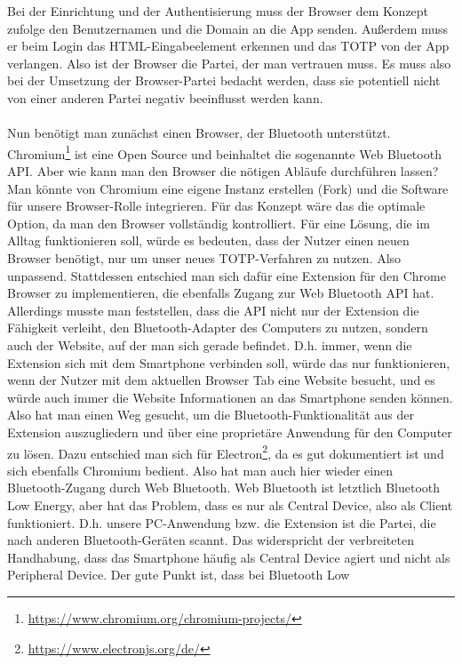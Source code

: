 Bei der Einrichtung und der Authentisierung muss der Browser dem Konzept zufolge 
den Benutzernamen und die Domain an die App senden. Außerdem muss er beim Login das 
HTML-Eingabeelement erkennen und das TOTP von der App verlangen. Also ist der 
Browser die Partei, der man vertrauen muss. Es muss also bei der Umsetzung der 
Browser-Partei bedacht werden, dass sie potentiell nicht von einer anderen Partei 
negativ beeinflusst werden kann.
\\\\
Nun benötigt man zunächst einen Browser, der Bluetooth unterstützt. 
Chromium\footnote{\href{https://www.chromium.org/chromium-projects/}{https://www.chromium.org/chromium-projects/}} 
ist eine Open Source und beinhaltet die sogenannte Web Bluetooth API. Aber wie kann 
man den Browser die nötigen Abläufe durchführen lassen? Man könnte von Chromium 
eine eigene Instanz erstellen (Fork) und die Software für unsere Browser-Rolle 
integrieren. Für das Konzept wäre das die optimale Option, da man den Browser 
vollständig kontrolliert. Für eine Lösung, die im Alltag funktionieren soll, würde 
es bedeuten, dass der Nutzer einen neuen Browser benötigt, nur um unser neues 
TOTP-Verfahren zu nutzen. Also unpassend. Stattdessen entschied man sich dafür eine 
Extension für den Chrome Browser zu implementieren, die ebenfalls Zugang zur Web 
Bluetooth API hat. Allerdings musste man feststellen, dass die API nicht nur der 
Extension die Fähigkeit verleiht, den Bluetooth-Adapter des Computers zu nutzen, 
sondern auch der Website, auf der man sich gerade befindet. D.h. immer, wenn die 
Extension sich mit dem Smartphone verbinden soll, würde das nur funktionieren, wenn 
der Nutzer mit dem aktuellen Browser Tab eine Website besucht, und es würde auch 
immer die Website Informationen an das Smartphone senden können. Also hat man einen 
Weg gesucht, um die Bluetooth-Funktionalität aus der Extension auszugliedern und 
über eine proprietäre Anwendung für den Computer zu lösen. Dazu entschied man sich 
für Electron\footnote{\href{https://www.electronjs.org/de/}{https://www.electronjs.org/de/}}, 
da es gut dokumentiert ist und sich ebenfalls Chromium bedient. Also hat man auch 
hier wieder einen Bluetooth-Zugang durch Web Bluetooth. Web Bluetooth ist letztlich 
Bluetooth Low Energy, aber hat das Problem, dass es nur als Central Device, also 
als Client funktioniert. D.h. unsere PC-Anwendung bzw. die Extension ist die 
Partei, die nach anderen Bluetooth-Geräten scannt. Das widerspricht der 
verbreiteten Handhabung, dass das Smartphone häufig als Central Device 
agiert und nicht als Peripheral Device. Der gute Punkt ist, dass bei Bluetooth Low 
